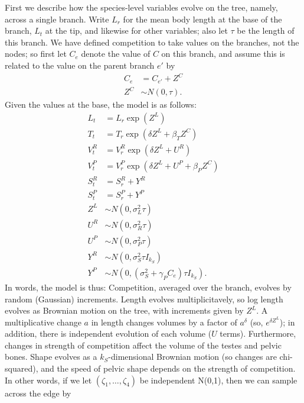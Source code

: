 \documentclass{article}
\begin{document}
First we describe how the species-level variables evolve on the tree,
namely, across a single branch.
Write $L_r$ for the mean body length at the base of the branch, $L_t$ at the tip,
and likewise for other variables;
also let $\tau$ be the length of this branch.
We have defined competition to take values on the branches, not the nodes;
so first let $C_e$ denote the value of $C$ on this branch, 
and assume this is related to the value on the parent branch $e'$ by
\begin{align}
    C_e &= C_{e'} + Z^C \\
    Z^C &\sim N(0,\tau) .
\end{align}
Given the values at the base, the model is as follows:
\begin{align}
    L_t &= L_r \exp( Z^L ) \\
    T_t &= T_r \exp( \delta Z^L + \beta_T Z^C ) \\
    V^R_t &= V^R_r \exp( \delta Z^L + U^R ) \\
    V^P_t &= V^P_r \exp( \delta Z^L + U^P + \beta_P Z^C ) \\
    S^R_t &= S^R_r + Y^R \\
    S^P_t &= S^P_r + Y^P \\
    Z^L &\sim N(0,\sigma^2_L \tau) \\
    U^R &\sim N(0,\sigma^2_R \tau) \\
    U^P &\sim N(0,\sigma^2_P \tau) \\
    Y^R &\sim N(0,\sigma^2_S \tau I_{k_S}) \\
    Y^P &\sim N(0,(\sigma^2_S +\gamma_P C_e) \tau I_{k_S}) .
\end{align}
In words, the model is thus:
Competition, averaged over the branch, evolves by random (Gaussian) increments.
Length evolves multiplicitavely,
so log length evolves as Brownian motion on the tree,
with increments given by $Z^L$.
A multiplicative change $a$ in length changes volumes by a factor of $a^\delta$ (so, $e^{\delta Z^L}$);
in addition, there is independent evolution of each volume ($U$ terms).
Furthermore, changes in strength of competition affect the volume of the testes and pelvic bones.
Shape evolves as a $k_S$-dimensional Brownian motion (so changes are chi-squared),
and the speed of pelvic shape depends on the strength of competition.
In other words, if we let
$(\zeta_1, \ldots, \zeta_4)$ be independent N(0,1),
then we can sample across the edge by
\end{document}
